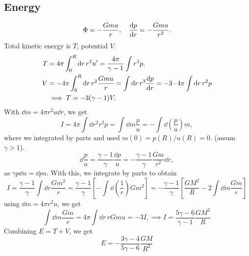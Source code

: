 \documentclass{book}
\begin{document}
\subsection{Energy}
    \begin{equation}
        \Phi = - \frac{G m u}{r}, \quad \odv{p}{r} = - \frac{G m u}{r^2}.
    \end{equation}
    Total kinetic energy is $T$, potential $V$.
    \begin{align}
        T &= 4 \pi \int_0^R\dd r\, r^2 u' = \frac{4 \pi}{\gamma - 1} \int r^2 p,\\
        V &= - 4 \pi \int_0^R \dd r \,  r^2 \frac{G m u}{r} = \int \dd r \, r^3 \odv{p}{r}
        = -3 \cdot 4 \pi \int \dd r\, r^2 p\\ 
        & \implies T = -3 (\gamma - 1) V.
    \end{align}
    With $\dd m = 4 \pi r^2 u \dd r$, we get
    \begin{equation}
        I = 4 \pi \int \dd r^2 r^2 p = \int \dd m \frac{p}{u} = - \int \dd \left(\frac{p}{u}\right) m,
    \end{equation}
    where we integrated by parts and used $m(0) = p(R)/u(R) = 0$. (assum $\gamma > 1$).
    \begin{equation}
        \dd \frac{p}{u} = \frac{\gamma - 1}{\gamma} \frac{\dd p}{u} = -\frac{\gamma - 1}{\gamma} \frac{Gm}{r^2} \dd r,
    \end{equation}
    as $\gamma p \dd u = \dd p u$. With this, we integrate by parts to obtain
    \begin{equation}
        I = \frac{\gamma - 1}{\gamma} \int \dd r \frac{G m^2}{r}
        = \frac{\gamma - 1}{\gamma} \left[  - \int \dd \left(\frac{1}{r}\right) Gm^2\right]
        = -\frac{\gamma - 1}{\gamma} \left[\frac{GM^2}{R} - 2 \int \dd m \frac{G m}{r} \right]
    \end{equation}
    using $\dd m = 4 \pi r^2 u$, we get
    \begin{equation}
        \int \dd m \frac{G m}{r} = 4\pi\int \dd r\, r G m u = -3I, \implies I = \frac{5\gamma - 6}{\gamma - 1} \frac{GM^2}{R}
    \end{equation}
    Combining $E = T + V$, we get
    \begin{equation}
        E = - \frac{3 \gamma  - 4}{5 \gamma - 6} \frac{G M}{R^2}
    \end{equation}
\end{document}
